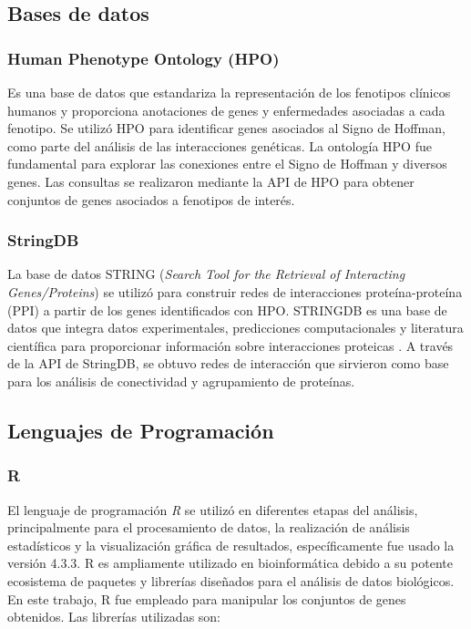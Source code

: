 \subsection{Bases de datos}

\subsubsection{Human Phenotype Ontology (HPO)}
Es una base de datos que estandariza la representación de los fenotipos clínicos humanos y proporciona anotaciones de genes y enfermedades asociadas a cada fenotipo\cite{gargano2024}. Se utilizó HPO para identificar genes asociados al Signo de Hoffman, como parte del análisis de las interacciones genéticas. La ontología HPO fue fundamental para explorar las conexiones entre el Signo de Hoffman y diversos genes. Las consultas se realizaron mediante la API de HPO para obtener conjuntos de genes asociados a fenotipos de interés.

\subsubsection{StringDB}
La base de datos STRING (\textit{Search Tool for the Retrieval of Interacting Genes/Proteins}) se utilizó para construir redes de interacciones proteína-proteína (PPI) a partir de los genes identificados con HPO. STRINGDB es una base de datos que integra datos experimentales, predicciones computacionales y literatura científica para proporcionar información sobre interacciones proteicas \cite{szklarczyk2019}. A través de la API de StringDB, se obtuvo redes de interacción que sirvieron como base para los análisis de conectividad y agrupamiento de proteínas.

\subsection{Lenguajes de Programación}

\subsubsection{R}
El lenguaje de programación \textit{R} se utilizó en diferentes etapas del análisis, principalmente para el procesamiento de datos, la realización de análisis estadísticos y la visualización gráfica de resultados, específicamente fue usado la versión 4.3.3. R es ampliamente utilizado en bioinformática debido a su potente ecosistema de paquetes y librerías diseñados para el análisis de datos biológicos\cite{chan2018}. En este trabajo, R fue empleado para manipular los conjuntos de genes obtenidos. Las librerías utilizadas son:


